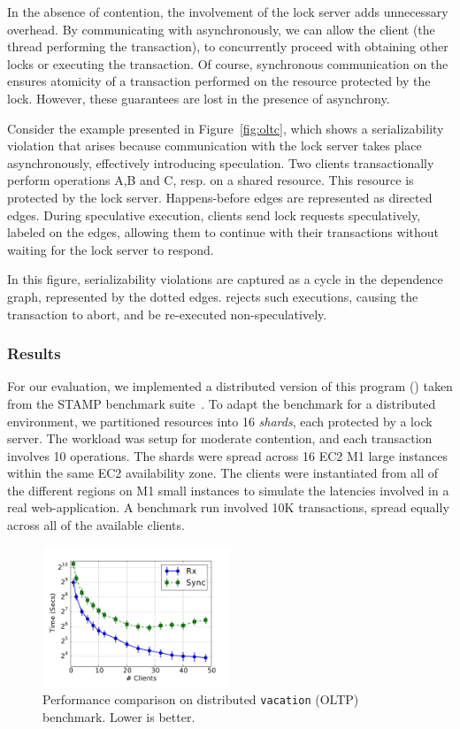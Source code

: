 In the absence of contention, the involvement of the lock server adds
unnecessary overhead.  By communicating with  asynchronously, we
can allow the client (the thread performing the transaction), to concurrently
proceed with obtaining other locks or executing the transaction.  Of course,
synchronous communication on the  ensures atomicity of a
transaction performed on the resource protected by the lock. However, these
guarantees are lost in the presence of asynchrony.

Consider the example presented in Figure~\ref{fig:oltc}, which shows a
serializability violation that arises because communication with the
lock server takes place asynchronously, effectively introducing speculation.
Two clients transactionally perform operations A,B and C, resp.  on a shared
resource. This resource is protected by the lock server.  Happens-before edges
are represented as directed edges. During speculative execution, clients send
lock requests speculatively, labeled  on the edges, allowing them to
continue with their transactions without waiting for the lock server to
respond.

In this figure, serializability violations are captured as a cycle in the
dependence graph, represented by the dotted edges. \rxcml rejects such
executions, causing the transaction to abort, and be re-executed
non-speculatively.

\subsubsection{Results}

For our evaluation, we implemented a distributed version of this program
() taken from the STAMP benchmark suite~\cite{STAMP}.  To adapt
the benchmark for a distributed environment, we partitioned resources into 16
\emph{shards}, each protected by a lock server.  The workload was setup for
moderate contention, and each transaction involves 10 operations. The shards
were spread across 16 EC2 M1 large instances within the same EC2 availability
zone. The clients were instantiated from all of the different regions on M1
small instances to simulate the latencies involved in a real web-application. A
benchmark run involved 10K transactions, spread equally across all of the
available clients.

\begin{figure}
\centering
\includegraphics[width=0.5\textwidth]{Graphs/oltp_time}
\caption{Performance comparison on distributed \texttt{vacation} (OLTP)
benchmark. Lower is better.}
\label{grf:oltp}
\end{figure}

